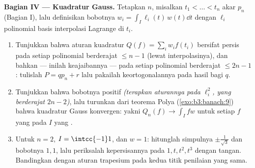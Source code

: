 \begin{problem}
\medskip
\noindent\textbf{Bagian IV --- Kuadratur Gauss.} Tetapkan $n$, misalkan
$t_1 < \dots < t_n$ akar $p_n$ (Bagian I), lalu definisikan
bobotnya $w_i = \int_I \ell_i(t)\,w(t)\dd t$ dengan
$\ell_i$ polinomial basis interpolasi Lagrange di
$t_i$.
\begin{enumerate}[resume]
  \item Tunjukkan bahwa aturan kuadratur $Q(f) = \sum_iw_if(t_i)$
        bersifat persis pada setiap polinomial berderajat $\leq n - 1$
        (lewat interpolasinya), dan bahkan --- inilah keajaibannya --- pada
        setiap polinomial berderajat $\leq 2n - 1$: tulislah $P =
        qp_n + r$ lalu pakailah keortogonalannya pada hasil bagi $q$.
  \item Tunjukkan bahwa bobotnya positif
        \emph{(terapkan aturannya pada $\ell_i^2$, yang berderajat $2n -
        2$)}, lalu turunkan dari teorema Polya
        (\cref{exo:b3:banach:9}) bahwa kuadratur Gauss
        konvergen: yakni $Q_n(f) \to \int_I fw$ untuk setiap $f$ yang
         pada $I$ yang .
  \item Untuk $n = 2$, $I = \intcc{-1}1$, dan $w = 1$: hitunglah
        simpulnya $\pm\frac1{\sqrt3}$ dan bobotnya $1, 1$, lalu
        periksalah kepersisannya pada $1, t, t^2, t^3$ dengan tangan. Bandingkan
        dengan aturan trapesium pada kedua titik penilaian yang sama.
\end{enumerate}


\end{problem}
